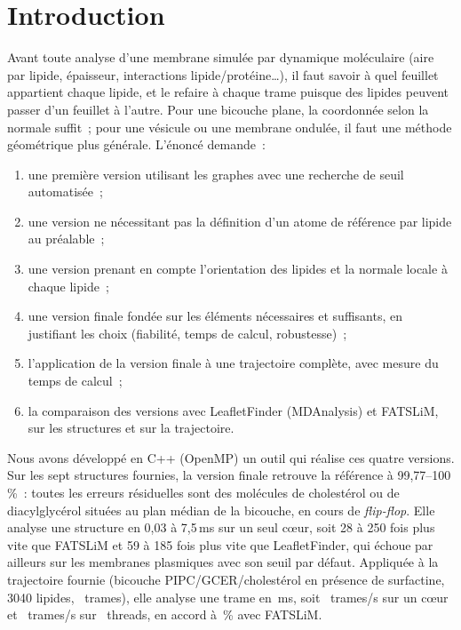 \documentclass[11pt,a4paper]{article}
\begin{document}
\section*{Introduction}
Avant toute analyse d'une membrane simulée par dynamique moléculaire (aire par lipide, épaisseur, interactions
lipide/protéine\ldots), il faut savoir à quel feuillet appartient chaque lipide, et le refaire à chaque trame
puisque des lipides peuvent passer d'un feuillet à l'autre. Pour une bicouche plane, la coordonnée selon la normale
suffit~; pour une vésicule ou une membrane ondulée, il faut une méthode géométrique plus générale. L'énoncé demande~:
\begin{enumerate}
\item une première version utilisant les graphes avec une recherche de seuil automatisée~;
\item une version ne nécessitant pas la définition d'un atome de référence par lipide au préalable~;
\item une version prenant en compte l'orientation des lipides et la normale locale à chaque lipide~;
\item une version finale fondée sur les éléments nécessaires et suffisants, en justifiant les choix
(fiabilité, temps de calcul, robustesse)~;
\item l'application de la version finale à une trajectoire complète, avec mesure du temps de calcul~;
\item la comparaison des versions avec LeafletFinder (MDAnalysis) et FATSLiM, sur les structures et sur la
trajectoire.
\end{enumerate}

Nous avons développé en C++ (OpenMP) un outil qui réalise ces quatre versions. Sur les sept structures fournies, la
version finale retrouve la référence à 99,77--100\,\%~: toutes les erreurs résiduelles sont des molécules de
cholestérol ou de diacylglycérol situées au plan médian de la bicouche, en cours de \emph{flip-flop}. Elle analyse
une structure en 0,03 à 7,5\,ms sur un seul cœur, soit 28 à 250 fois plus vite que FATSLiM et 59 à 185 fois plus
vite que LeafletFinder, qui échoue par ailleurs sur les membranes plasmiques avec son seuil par défaut. Appliquée à la
trajectoire fournie (bicouche PIPC/GCER/cholestérol en présence de surfactine, 3040 lipides, \TPTrames~trames), elle
analyse une trame en \TPVq\,ms, soit \TPSeqHz~trames/s sur un cœur et \TPParHz~trames/s sur \TNcpu~threads, en
accord à \TPAccFat\,\% avec FATSLiM.
\end{document}
